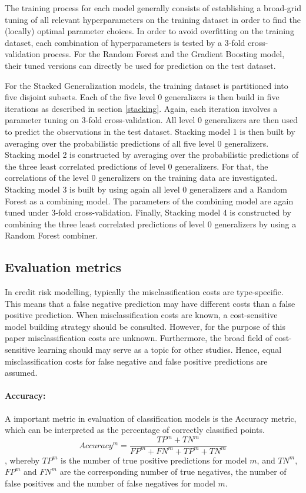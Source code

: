 \documentclass[12pt]{article}
\begin{document}
The training process for each model generally consists of establishing a broad-grid tuning of all relevant hyperparameters on the training dataset in order to find the (locally) optimal parameter choices. In order to avoid overfitting on the training dataset, each combination of hyperparameters is tested by a 3-fold cross-validation process. For the Random Forest and the Gradient Boosting model, their tuned versions can directly be used for prediction on the test dataset.

For the Stacked Generalization models, the training dataset is partitioned into five disjoint subsets. Each of the five level 0 generalizers is then build in five iterations as described in section \ref{stacking}. Again, each iteration involves a parameter tuning on 3-fold cross-validation. All level 0 generalizers are then used to predict the observations in the test dataset. Stacking model 1 is then built by averaging over the probabilistic predictions of all five level 0 generalizers. Stacking model 2 is constructed by averaging over the probabilistic predictions of the three least correlated predictions of level 0 generalizers. For that, the correlations of the level 0 generalizers on the training data are investigated. Stacking model 3 is built by using again all level 0 generalizers and a Random Forest as a combining model. The parameters of the combining model are again tuned under 3-fold cross-validation. Finally, Stacking model 4 is constructed by combining the three least correlated predictions of level 0 generalizers by using a Random Forest combiner.

\subsection{Evaluation metrics}\label{metrics}
In credit risk modelling, typically the misclassification costs are type-specific. This means that a false negative prediction may have different costs than a false positive prediction. When misclassification costs are known, a cost-sensitive model building strategy should be consulted. However, for the purpose of this paper misclassification costs are unknown. Furthermore, the broad field of cost-sensitive learning should may serve as a topic for other studies. Hence, equal misclassification costs for false negative and false positive predictions are assumed.

\paragraph{Accuracy:} A important metric in evaluation of classification models is the Accuracy metric, which can be interpreted as the percentage of correctly classified points.
\begin{equation}
Accuracy^m = \frac{TP^m + TN^m}{FP^m + FN^m + TP^m + TN^m}
\end{equation}
, whereby $TP^m$ is the number of true positive predictions for model $m$, and $TN^m$, $FP^m$ and $FN^m$ are the corresponding number of true negatives, the number of false positives and the number of false negatives for model $m$.
\end{document}
